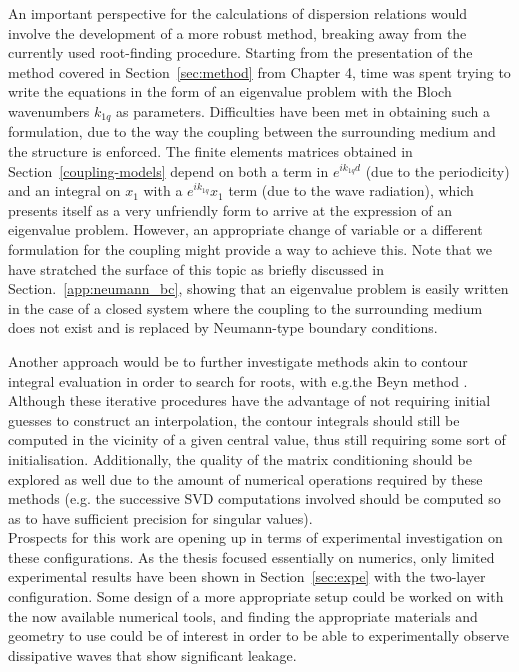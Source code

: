 An important perspective for the calculations of dispersion relations would involve the development of a more robust method, breaking away from the currently used root-finding procedure. Starting from the presentation of the method covered in Section~\ref{sec:method} from Chapter 4, time was spent trying to write the equations in the form of an eigenvalue problem with the Bloch wavenumbers $k_{1q}$ as parameters. Difficulties have been met in obtaining such a formulation, due to the way the coupling between the surrounding medium and the structure is enforced. The finite elements matrices obtained in Section~\ref{coupling-models} depend on both a term in $e^{ik_{1q}d}$ (due to the periodicity) and an integral on $x_1$ with a $ e^{ik_{1q}}x_1 $ term (due to the wave radiation), which presents itself as a very unfriendly form to arrive at the expression of an eigenvalue problem. However, an appropriate change of variable or a different formulation for the coupling might provide a way to achieve this. Note that we have stratched the surface of this topic as briefly discussed in Section.~\ref{app:neumann_bc}, showing that an eigenvalue problem is easily written in the case of a closed system where the coupling to the surrounding medium does not exist and is replaced by Neumann-type boundary conditions.

Another approach would be to further investigate methods akin to contour integral evaluation in order to search for roots, with e.g.the Beyn method \cite{guttel2017, liu2025}. Although these iterative procedures have the advantage of not requiring initial guesses to construct an interpolation, the contour integrals should still be computed in the vicinity of a given central value, thus still requiring some sort of initialisation. Additionally, the quality of the matrix conditioning should be explored as well due to the amount of numerical operations required by these methods (e.g. the successive SVD computations involved should be computed so as to have sufficient precision for singular values). \\

Prospects for this work are opening up in terms of experimental investigation on these configurations. As the thesis focused essentially on numerics, only limited experimental results have been shown in Section~\ref{sec:expe} with the two-layer configuration. Some design of a more appropriate setup could be worked on with the now available numerical tools, and finding the appropriate materials and geometry to use could be of interest in order to be able to experimentally observe dissipative waves that show significant leakage.

